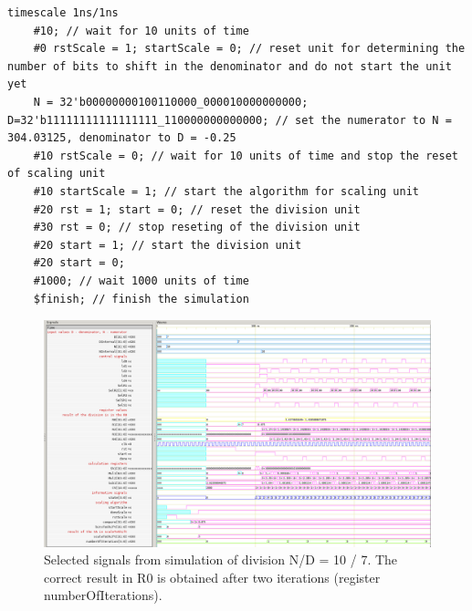 \documentclass[a4paper, twoside, 11pt]{article}
\begin{document}
\begin{lstlisting}[language={pseudocode}, caption={Pseudocode snippet for the Verilog simulation test bench.}, label= {lst:division-testbench-verilog-pseudocode}]
    timescale 1ns/1ns 
    #10; // wait for 10 units of time
    #0 rstScale = 1; startScale = 0; // reset unit for determining the number of bits to shift in the denominator and do not start the unit yet
    N = 32'b00000000100110000_000010000000000; D=32'b11111111111111111_110000000000000; // set the numerator to N = 304.03125, denominator to D = -0.25
    #10 rstScale = 0; // wait for 10 units of time and stop the reset of scaling unit
    #10 startScale = 1; // start the algorithm for scaling unit
    #20 rst = 1; start = 0; // reset the division unit
    #30 rst = 0; // stop reseting of the division unit
    #20 start = 1; // start the division unit
    #20 start = 0;
    #1000; // wait 1000 units of time
    $finish; // finish the simulation
\end{lstlisting}

\begin{figure}[htbp!]
  \centering
  \includegraphics[width=1\textwidth]{src/png/inverted/division-10-div-7.png}
    \caption{Selected signals from simulation of division N/D = 10 / 7. The correct result in R0 is obtained after two iterations (register numberOfIterations).}
  \label{fig:division-10-div-7}
\end{figure}
\end{document}
